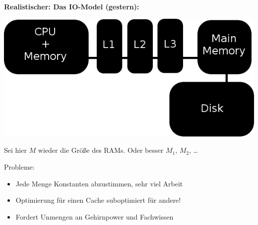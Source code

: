 \documentclass{beamer}
\begin{document}

\begin{frame}
\textbf{Realistischer: Das IO-Model (\glqq gestern\grqq):}

\begin{center}
\includegraphics[scale=0.325]{model2.png} 
\end{center}
Sei hier $M$ wieder die Größe des RAMs. Oder besser $M_1$, $M_2$, \dots\smallskip\smallskip
\pause

Probleme:
\begin{itemize}
\item Jede Menge Konstanten abzustimmen, sehr viel Arbeit\pause
\item Optimierung für einen Cache suboptimiert für andere!\pause
\item Fordert Unmengen an Gehirnpower und Fachwissen 
\end{itemize}
\end{frame}

\end{document}
